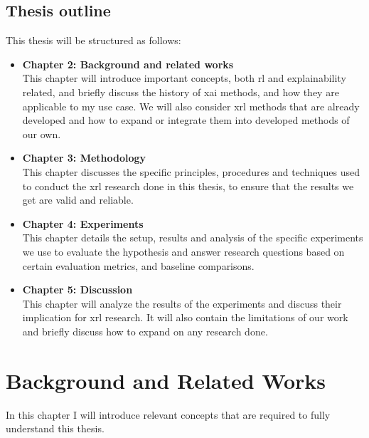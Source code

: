 \documentclass[UKenglish]{uiomasterthesis}
\begin{document}
\section{Thesis outline}
This thesis will be structured as follows:
\begin{itemize}

    \item \textbf{Chapter 2: Background and related works}\\
        This chapter will introduce important concepts, both \ac{rl} and explainability related, and briefly discuss the history of \ac{xai} methods, and how they are applicable to my use case. We will also consider \ac{xrl} methods that are already developed and how to expand or integrate them into developed methods of our own.

    \item \textbf{Chapter 3: Methodology}\\
        This chapter discusses the specific principles, procedures and techniques used to conduct the \ac{xrl} research done in this thesis, to ensure that the results we get are valid and reliable.

    \item \textbf{Chapter 4: Experiments}\\
        This chapter details the setup, results and analysis of the specific experiments we use to evaluate the hypothesis and answer research questions based on certain evaluation metrics, and baseline comparisons.

    \item \textbf{Chapter 5: Discussion}\\
        This chapter will analyze the results of the experiments and discuss their implication for \ac{xrl} research. It will also contain the limitations of our work and briefly discuss how to expand on any research done.
\end{itemize}


\medskip
\chapter{Background and Related Works}
In this chapter I will introduce relevant concepts that are required to fully understand this thesis.
\end{document}

